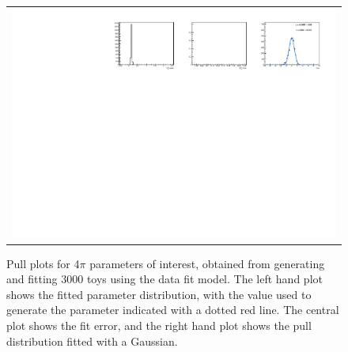 \begin{figure}
\begin{tabular}{c}
\includegraphics[width=\textwidth]{ANA_resources/Plots/Data_fit/FitterBias//R_ds_pipipipi_run2.pdf} \\
  \end{tabular}
  \caption{Pull plots for 4$\pi$ parameters of interest, obtained from generating and fitting 3000 toys using the data fit model. The left hand plot shows the fitted parameter distribution, with the value used to generate the parameter indicated with a dotted red line. The central plot shows the fit error, and the right hand plot shows the pull distribution fitted with a Gaussian.}
\label{fig:4pi_pulls}
\end{figure}
